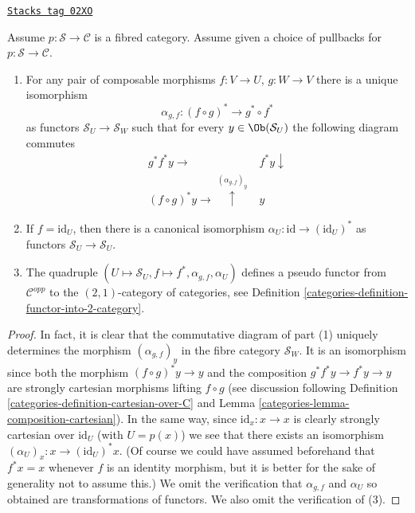 \begin{lemma}[Fibred]
\label{categories-lemma-fibred}
\href{https://stacks.math.columbia.edu/tag/02XO}{\texttt{Stacks tag 02XO}}

Assume $p : \mathcal{S} \to \mathcal{C}$ is a fibred category.
Assume given a choice of pullbacks for $p : \mathcal{S} \to \mathcal{C}$.
\begin{enumerate}
\item For any pair of composable morphisms $f : V \to U$,
$g : W \to V$ there is a unique isomorphism
$$
\alpha_{g, f} :
(f \circ g)^\ast
\longrightarrow
g^\ast \circ f^\ast
$$
as functors $\mathcal{S}_U \to \mathcal{S}_W$
such that for every $y\in \Ob(\mathcal{S}_U)$ the following
diagram commutes
$$
\begin{array}{cc}g^\ast f^\ast y \longrightarrow & f^\ast y \downarrow \\ (f \circ g)^\ast y \longrightarrow\overset{(\alpha_{g, f})_y}{\uparrow} & y\end{array}
$$
\item If $f = \text{id}_U$, then there is a canonical isomorphism
$\alpha_U : \text{id} \to (\text{id}_U)^*$ as functors
$\mathcal{S}_U \to \mathcal{S}_U$.
\item The quadruple
$(U \mapsto \mathcal{S}_U, f \mapsto f^*, \alpha_{g, f}, \alpha_U)$
defines a pseudo functor from $\mathcal{C}^{opp}$ to
the $(2, 1)$-category of categories, see
Definition \ref{categories-definition-functor-into-2-category}.
\end{enumerate}
\end{lemma}

\begin{proof}

In fact, it is clear that the commutative diagram of
part (1) uniquely determines the morphism
$(\alpha_{g, f})_y$ in the fibre category
$\mathcal{S}_W$. It is an isomorphism since both
the morphism $(f \circ g)^*y \to y$
and the composition $g^*f^*y \to f^*y \to y$ are strongly
cartesian morphisms lifting $f \circ g$ (see discussion
following Definition \ref{categories-definition-cartesian-over-C} and
Lemma \ref{categories-lemma-composition-cartesian}). In the same way,
since $\text{id}_x : x \to x$ is clearly strongly cartesian
over $\text{id}_U$ (with $U = p(x)$) we see that there exists
an isomorphism $(\alpha_U)_x : x \to (\text{id}_U)^*x$.
(Of course we could have assumed beforehand that $f^*x = x$
whenever $f$ is an identity morphism, but it is better for
the sake of generality not to assume this.)
We omit the verification that $\alpha_{g, f}$ and
$\alpha_U$ so obtained are transformations of functors.
We also omit the verification of (3).
\end{proof}

